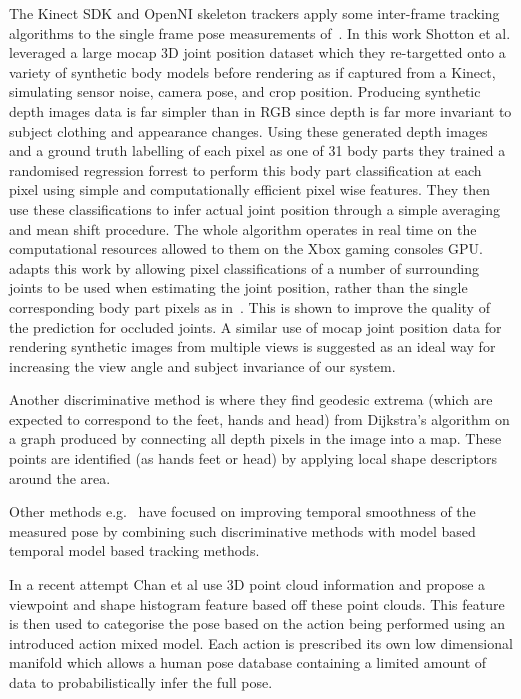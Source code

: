 \documentclass[11pt]{article} %
\begin{document}
The Kinect SDK and OpenNI skeleton trackers apply some inter-frame tracking algorithms to the single frame pose measurements of~\cite{Shotton2011}. In this work Shotton et al. leveraged a large mocap 3D joint position dataset which they re-targetted onto a variety of synthetic body models before rendering as if captured from a Kinect, simulating sensor noise, camera pose, and crop position. Producing synthetic depth images data is far simpler than in RGB since depth is far more invariant to subject clothing and appearance changes. Using these generated depth images and a ground truth labelling of each pixel as one of 31 body parts they trained a randomised regression forrest to perform this body part classification at each pixel using simple and computationally efficient pixel wise features. They then use these classifications to infer actual joint position through a simple averaging and mean shift procedure. The whole algorithm operates in real time on the computational resources allowed to them on the Xbox gaming consoles GPU. \cite{Shotton2013a} adapts this work by allowing pixel classifications of a number of surrounding joints to be used when estimating the joint position, rather than the single corresponding body part pixels as in~\cite{Shotton2011}. This is shown to improve the quality of the prediction for occluded joints. A similar use of mocap joint position data for rendering synthetic images from multiple views is suggested as an ideal way for increasing the view angle and subject invariance of our system.

Another discriminative method is \cite{Plagemann2010} where they find geodesic extrema (which are expected to correspond to the feet, hands and head) from Dijkstra’s algorithm on a graph produced by connecting all depth pixels in the image into a map. These points are identified (as hands feet or head) by applying local shape descriptors around the area. 

Other methods e.g.~\cite{Ye2011,Wei2011,Baak2011,Zhu2008} have focused on improving temporal smoothness of the measured pose by combining such discriminative methods with model based temporal model based tracking methods. 

In a recent attempt Chan et al \cite{Chan2014} use 3D point cloud information and propose a viewpoint and shape histogram feature based off these point clouds. This feature is then used to categorise the pose based on the action being performed using an introduced action mixed model. Each action is prescribed its own low dimensional manifold which allows a human pose database containing a limited amount of data to probabilistically infer the full pose.
\end{document}
